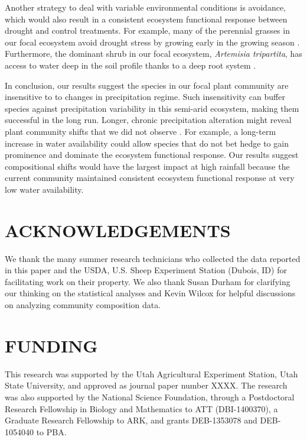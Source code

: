 \documentclass[fleqn,10pt,lineno]{wlpeerj} %
\begin{document}
Another strategy to deal with variable environmental conditions is
avoidance, which would also result in a consistent ecosystem functional
response between drought and control treatments. For example, many of
the perennial grasses in our focal ecosystem avoid drought stress by
growing early in the growing season \citep[A.R. Kleinhesselink, personal
observation]{Blaisdell1958}. Furthermore, the dominant shrub in our
focal ecosystem, \emph{Artemisia tripartita}, has access to water deep
in the soil profile thanks to a deep root system
\citep{Kulmatiski2017a}.

In conclusion, our results suggest the species in our focal plant
community are insensitive to to changes in precipitation regime. Such
insensitivity can buffer species against precipitation variability in
this semi-arid ecosystem, making them successful in the long run.
Longer, chronic precipitation alteration might reveal plant community
shifts that we did not observe \citep[e.g.,][]{Wilcox2016}. For example,
a long-term increase in water availability could allow species that do
not bet hedge to gain prominence and dominate the ecosystem functional
response. Our results suggest compositional shifts would have the
largest impact at high rainfall because the current community maintained
consistent ecosystem functional response at very low water availability.

\section{ACKNOWLEDGEMENTS}\label{acknowledgements}

We thank the many summer research technicians who collected the data
reported in this paper and the USDA, U.S. Sheep Experiment Station
(Dubois, ID) for facilitating work on their property. We also thank
Susan Durham for clarifying our thinking on the statistical analyses and
Kevin Wilcox for helpful discussions on analyzing community composition
data.

\section{FUNDING}\label{funding}

This research was supported by the Utah Agricultural Experiment Station,
Utah State University, and approved as journal paper number XXXX. The
research was also supported by the National Science Foundation, through
a Postdoctoral Research Fellowship in Biology and Mathematics to ATT
(DBI-1400370), a Graduate Research Fellowship to ARK, and grants
DEB-1353078 and DEB-1054040 to PBA.
\end{document}

